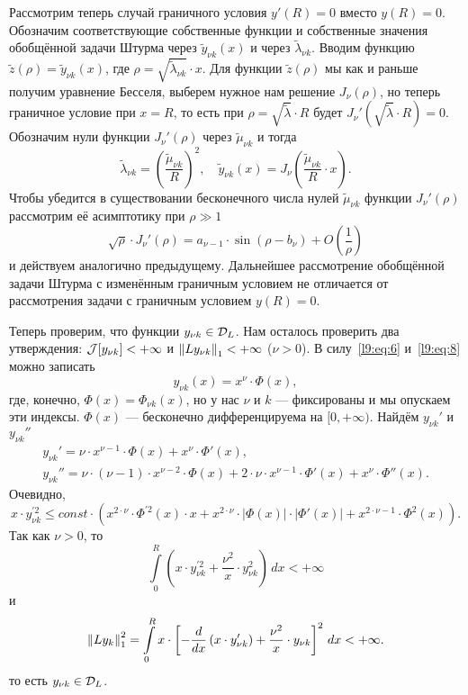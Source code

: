 Рассмотрим теперь случай граничного условия $y'(R)=0$ вместо $y(R)=0$. Обозначим соответствующие собственные функции и собственные значения обобщённой задачи Штурма через $\tilde{y}_{\nu k}(x)$ и через $\tilde{\lambda}_{\nu k}$. Вводим функцию $\tilde{z}(\rho)=\tilde{y}_{\nu k}(x)$, где $\rho=\sqrt{\tilde{\lambda}_{\nu k}}\cdot x$. Для функции $\tilde{z}(\rho)$ мы как и раньше получим уравнение Бесселя, выберем нужное нам решение $J_{\nu}(\rho)$, но теперь граничное условие при $x=R$, то есть при $\rho=\sqrt{\tilde{\lambda}}\cdot R$ будет $J_{\nu}'\left(\sqrt{\tilde{\lambda}}\cdot R\right)=0$. Обозначим нули функции $J_{\nu}'(\rho)$ через $\tilde{\mu}_{\nu k}$ и тогда 
\begin{equation*}
	\tilde{\lambda}_{\nu k}=\left(\frac{\tilde{\mu}_{\nu k}}{R}\right)^2,\quad \tilde{y}_{\nu k}(x)=J_{\nu}\left(\frac{\tilde{\mu}_{\nu k}}{R}\cdot x\right).
\end{equation*}
Чтобы убедится в существовании бесконечного числа нулей $\tilde{\mu}_{\nu k}$ функции $J_{\nu}'(\rho)$ рассмотрим её асимптотику при $\rho\gg1$
\begin{equation}\label{l9:eq:1.11}
	\sqrt{\rho}\cdot J_{\nu}'(\rho)=a_{\nu-1}\cdot\sin(\rho-b_{\nu})+O\left(\frac{1}{\rho}\right)
\end{equation}
и действуем аналогично предыдущему. Дальнейшее рассмотрение обобщённой задачи Штурма с изменённым граничным условием не отличается от рассмотрения задачи с граничным условием $y(R)=0$.

Теперь проверим, что функции $y_{\nu k}\in\mathcal{D}_L$. Нам осталось проверить два утверждения: $\J[y_{\nu k}]\?<+\infty$ и $\left\|Ly_{\nu k}\right\|_1<+\infty$ ($\nu>0$). В силу~\eqref{l9:eq:6} и~\eqref{l9:eq:8} можно записать
\begin{equation*}
	 y_{\nu k}(x)=x^{\nu}\cdot\Phi(x), 
\end{equation*}
где, конечно, $\Phi(x)=\Phi_{\nu k}(x)$, но у нас $\nu$ и $k$ --- фиксированы и мы опускаем эти индексы. $\Phi(x)$ --- бесконечно дифференцируема на $[0,+\infty)$. Найдём $y_{\nu k}'$ и $y_{\nu k}''$
\begin{gather*}
	 y_{\nu k}'=\nu\cdot x^{\nu-1}\cdot\Phi(x)+x^{\nu}\cdot\Phi'(x),\\ y_{\nu k}''=\nu\cdot(\nu-1)\cdot x^{\nu-2}\cdot\Phi(x)+2\cdot\nu\cdot x^{\nu-1}\cdot\Phi'(x)+x^{\nu}\cdot\Phi''(x).
\end{gather*}
Очевидно,
\begin{equation*}
	 x\cdot y_{\nu k}^{\prime2}\leqslant const\cdot\left(x^{2\cdot\nu}\cdot\Phi^{\prime2}(x)\cdot x+x^{2\cdot\nu}\cdot|\Phi(x)|\cdot|\Phi'(x)|+x^{2\cdot\nu-1}\cdot\Phi^2(x)\right).
\end{equation*}
Так как $\nu>0$, то
\begin{equation*}
	\int\limits_0^R\left(x\cdot y_{\nu k}^{\prime2}+\frac{\nu^2}{x}\cdot y_{\nu k}^2\right)\,dx<+\infty
\end{equation*}
и 
\begin{equation*}
	\left\|Ly_k\right\|_1^2=\int\limits_0^R x\cdot\left[-\frac{d}{dx}\left(x\cdot y_{\nu k}'\right)+\frac{\nu^2}{x}\cdot y_{\nu k}\right]^2\,dx<+\infty.
\end{equation*}
то есть $y_{\nu k}\in\mathcal{D}_L$. 


